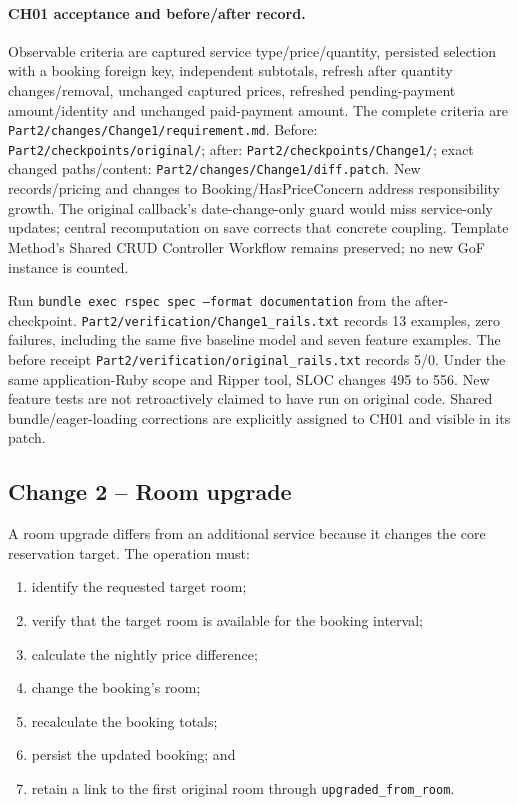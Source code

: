 \documentclass[10pt,a4paper]{article}
\newcommand{\code}[1]{\texttt{\small #1}}
\begin{document}
\paragraph{CH01 acceptance and before/after record.}
Observable criteria are captured service type/price/quantity, persisted selection with a booking foreign key, independent subtotals, refresh after quantity changes/removal, unchanged captured prices, refreshed pending-payment amount/identity and unchanged paid-payment amount. The complete criteria are \code{Part2/changes/Change1/requirement.md}. Before: \code{Part2/checkpoints/original/}; after: \code{Part2/checkpoints/Change1/}; exact changed paths/content: \code{Part2/changes/Change1/diff.patch}. New records/pricing and changes to Booking/HasPriceConcern address responsibility growth. The original callback's date-change-only guard would miss service-only updates; central recomputation on save corrects that concrete coupling. Template Method's Shared CRUD Controller Workflow remains preserved; no new GoF instance is counted.

Run \code{bundle exec rspec spec --format documentation} from the after-checkpoint. \code{Part2/verification/Change1\_rails.txt} records 13 examples, zero failures, including the same five baseline model and seven feature examples. The before receipt \code{Part2/verification/original\_rails.txt} records 5/0. Under the same application-Ruby scope and Ripper tool, SLOC changes 495 to 556. New feature tests are not retroactively claimed to have run on original code. Shared bundle/eager-loading corrections are explicitly assigned to CH01 and visible in its patch.

\subsection{Change 2 -- Room upgrade}

A room upgrade differs from an additional service because it changes the core reservation target. The operation must:

\begin{enumerate}[leftmargin=*]
\item identify the requested target room;
\item verify that the target room is available for the booking interval;
\item calculate the nightly price difference;
\item change the booking's room;
\item recalculate the booking totals;
\item persist the updated booking; and
\item retain a link to the first original room through \code{upgraded\_from\_room}.
\end{enumerate}
\end{document}
